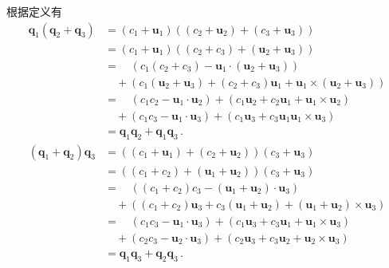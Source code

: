 \begin{prove}
    根据定义有
    \begin{align}
        {\bm q}_1({\bm q}_2+{\bm q}_3) & =(c_1+{\bm u}_1)((c_2+{\bm u}_2)+(c_3+{\bm u}_3))\nonumber                                            \\
                                       & =(c_1+{\bm u}_1)((c_2+c_3)+({\bm u}_2+{\bm u}_3))\nonumber                                            \\
                                       & =\quad (c_1(c_2+c_3)-{\bm u}_1\cdot({\bm u}_2+{\bm u}_3))\nonumber                                    \\
                                       & \quad +(c_1({\bm u}_2+{\bm u}_3)+(c_2+c_3){\bm u}_1+{\bm u}_1\times({\bm u}_2+{\bm u}_3))\nonumber    \\
                                       & =\quad (c_1c_2-{\bm u}_1\cdot{\bm u}_2)+(c_1{\bm u}_2+c_2{\bm u}_1+{\bm u}_1\times{\bm u}_2)\nonumber \\
                                       & \quad +(c_1c_3-{\bm u}_1\cdot{\bm u}_3)+(c_1{\bm u}_3+c_3{\bm u}_1{\bm u}_1\times{\bm u}_3)\nonumber  \\
                                       & ={\bm q}_1{\bm q}_2+{\bm q}_1{\bm q}_3\, .
    \end{align}
    \begin{align}
        ({\bm q}_1+{\bm q}_2){\bm q}_3 & =((c_1+{\bm u}_1)+(c_2+{\bm u}_2))(c_3+{\bm u}_3)\nonumber                                            \\
                                       & =((c_1+c_2)+({\bm u}_1+{\bm u}_2))(c_3+{\bm u}_3)\nonumber                                            \\
                                       & =\quad ((c_1+c_2)c_3-({\bm u}_1+{\bm u}_2)\cdot{\bm u}_3)\nonumber                                    \\
                                       & \quad +((c_1+c_2){\bm u}_3+c_3({\bm u}_1+{\bm u}_2)+({\bm u}_1+{\bm u}_2)\times{\bm u}_3)\nonumber    \\
                                       & =\quad (c_1c_3-{\bm u}_1\cdot{\bm u}_3)+(c_1{\bm u}_3+c_3{\bm u}_1+{\bm u}_1\times{\bm u}_3)\nonumber \\
                                       & \quad +(c_2c_3-{\bm u}_2\cdot{\bm u}_3)+(c_2{\bm u}_3+c_3{\bm u}_2+{\bm u}_2\times{\bm u}_3)\nonumber \\
                                       & ={\bm q}_1{\bm q}_3+{\bm q}_2{\bm q}_3\, .
    \end{align}
\end{prove}
